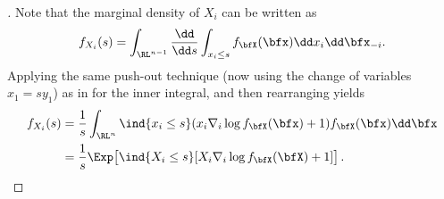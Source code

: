 \begin{subappendices}
\begin{proof}[]
Note that the marginal density of $X_i$ can be written as
 \[ f_{X_i}(s)
    =\int_{\RL^{n-1}} \frac{\dd}{\dd s}  \int_{x_i \le s} f_{\bfX}(\bfx) \dd x_i \dd \bfx_{-i}.
 \]
 Applying the same push-out technique (now using the change of variables $x_1 = s y_1$) as in  for the inner integral, and then rearranging yields
 \begin{align*}
    f_{X_i}(s)
    &=\frac1s \int_{\RL^{n}} \ind{x_i \le s} (x_i \nabla_i \log f_{\bfX}(\bfx) + 1 )  f_{\bfX}(\bfx) \dd \bfx \\
    &= \frac1s \Exp \bigl[ \ind{ X_i \le s} [ X_i \nabla_i \log f_{\bfX}(\bfX) + 1 ] \bigr] \,.
    \end{align*}

\end{proof}



\end{subappendices}